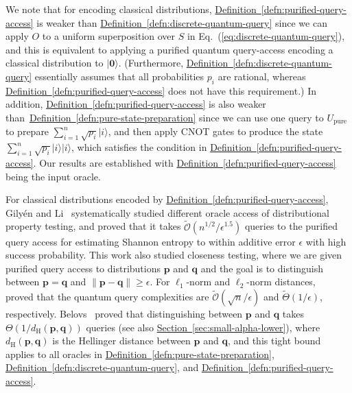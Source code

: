 \documentclass[journal]{IEEEtran}
\newcommand{\eq}[1]{Eq.~(\ref{eq:#1})}
\newcommand{\defn}[1]{\hyperref[defn:#1]{Definition~\ref*{defn:#1}}}
\renewcommand{\sec}[1]{\hyperref[sec:#1]{Section~\ref*{sec:#1}}}
\begin{document}
We note that for encoding classical distributions, \defn{purified-query-access} is weaker than \defn{discrete-quantum-query} since we can apply $O$ to a uniform superposition over $S$ in \eq{discrete-quantum-query}, and this is equivalent to applying a purified quantum query-access encoding a classical distribution to $|\mathbf{0}\rangle$. (Furthermore, \defn{discrete-quantum-query} essentially assumes that all probabilities $p_{i}$ are rational, whereas \defn{purified-query-access} does not have this requirement.) %
In addition, \defn{purified-query-access} is also weaker than~\defn{pure-state-preparation} since we can use one query to $U_{\mathrm{pure}}$ to prepare $\sum_{i=1}^n \sqrt{p_i}|i\rangle$, and then apply CNOT gates to produce the state $\sum_{i=1}^n \sqrt{p_i}|i\rangle|i\rangle$, which satisfies the condition in \defn{purified-query-access}. Our results are established with \defn{purified-query-access} being the input oracle.

For classical distributions encoded by \defn{purified-query-access}, Gily{\'e}n and Li~\cite{gilyen2019distributional} systematically studied different oracle access of distributional property testing, and proved that it takes $\widetilde{\mathcal{O}}(n^{1/2}/\epsilon^{1.5})$ queries to the purified query access for estimating Shannon entropy to within additive error $\epsilon$ with high success probability. This work also studied closeness testing, where we are given purified query access to distributions $\mathbf{p}$ and $\mathbf{q}$ and the goal is to distinguish between $\mathbf{p}=\mathbf{q}$ and $\|\mathbf{p}-\mathbf{q}\|\geq\epsilon$. For $\ell_{1}$-norm and $\ell_{2}$-norm distances,~\cite{gilyen2019distributional} proved that the quantum query complexities are $\widetilde{\mathcal{O}}(\sqrt{n}/\epsilon)$ and $\widetilde{\Theta}(1/\epsilon)$, respectively.  Belovs~\cite{belovs2019quantum} proved that distinguishing between $\mathbf{p}$ and $\mathbf{q}$ takes $\Theta(1/d_{\textrm{H}}(\mathbf{p},\mathbf{q}))$ queries (see also \sec{small-alpha-lower}), where $d_{\textrm{H}}(\mathbf{p},\mathbf{q})$ is the Hellinger distance between $\mathbf{p}$ and $\mathbf{q}$, and this tight bound applies to all oracles in \defn{pure-state-preparation}, \defn{discrete-quantum-query}, and  \defn{purified-query-access}.
\end{document}
